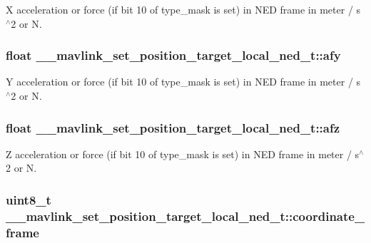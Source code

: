 X acceleration or force (if bit 10 of type\+\_\+mask is set) in N\+E\+D frame in meter / s$^\wedge$2 or N. 

\hypertarget{struct____mavlink__set__position__target__local__ned__t_ad110886eb30fa38fc2e37fbd57eefc11}{
\subsubsection[{afy}]{\setlength{\rightskip}{0pt plus 5cm}float \+\_\+\+\_\+mavlink\+\_\+set\+\_\+position\+\_\+target\+\_\+local\+\_\+ned\+\_\+t\+::afy}}\label{struct____mavlink__set__position__target__local__ned__t_ad110886eb30fa38fc2e37fbd57eefc11}


Y acceleration or force (if bit 10 of type\+\_\+mask is set) in N\+E\+D frame in meter / s$^\wedge$2 or N. 

\hypertarget{struct____mavlink__set__position__target__local__ned__t_a4af3525071d759e517d6ee12f1a1e7e2}{
\subsubsection[{afz}]{\setlength{\rightskip}{0pt plus 5cm}float \+\_\+\+\_\+mavlink\+\_\+set\+\_\+position\+\_\+target\+\_\+local\+\_\+ned\+\_\+t\+::afz}}\label{struct____mavlink__set__position__target__local__ned__t_a4af3525071d759e517d6ee12f1a1e7e2}


Z acceleration or force (if bit 10 of type\+\_\+mask is set) in N\+E\+D frame in meter / s$^\wedge$2 or N. 

\hypertarget{struct____mavlink__set__position__target__local__ned__t_a7a7e0d9ee4e81df555ed8847ded4f317}{
\subsubsection[{coordinate\+\_\+frame}]{\setlength{\rightskip}{0pt plus 5cm}uint8\+\_\+t \+\_\+\+\_\+mavlink\+\_\+set\+\_\+position\+\_\+target\+\_\+local\+\_\+ned\+\_\+t\+::coordinate\+\_\+frame}}\label{struct____mavlink__set__position__target__local__ned__t_a7a7e0d9ee4e81df555ed8847ded4f317}


